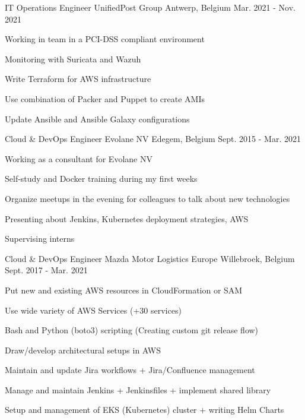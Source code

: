 \begin{cventries}
  \cventry
    {IT Operations Engineer} %
    {UnifiedPost Group} %
    {Antwerp, Belgium} %
    {Mar. 2021 - Nov. 2021} %
    {
      \begin{cvitems} %
        \item {Working in team in a PCI-DSS compliant environment}
        \item {Monitoring with Suricata and Wazuh}
        \item {Write Terraform for AWS infrastructure}
        \item {Use combination of Packer and Puppet to create AMIs}
        \item {Update Ansible and Ansible Galaxy configurations}
      \end{cvitems}
    }

  \cventry
    {Cloud \& DevOps Engineer} %
    {Evolane NV} %
    {Edegem, Belgium} %
    {Sept. 2015 - Mar. 2021} %
    {
      \begin{cvitems} %
        \item {Working as a consultant for Evolane NV}
        \item {Self-study and Docker training during my first weeks}
        \item {Organize meetups in the evening for colleagues to talk about new technologies}
        \item {Presenting about Jenkins, Kubernetes deployment strategies, AWS}
        \item {Supervising interns}
      \end{cvitems}
    }

  \cventry
    {Cloud \& DevOps Engineer} %
    {Mazda Motor Logistics Europe} %
    {Willebroek, Belgium} %
    {Sept. 2017 - Mar. 2021} %
    {
      \begin{cvitems} %
        \item {Put new and existing AWS resources in CloudFormation or SAM}
        \item {Use wide variety of AWS Services (+30 services)}
        \item {Bash and Python (boto3) scripting (Creating custom git release flow)}
        \item {Draw/develop architectural setups in AWS}
        \item {Maintain and update Jira workflows + Jira/Confluence management}
        \item {Manage and maintain Jenkins + Jenkinsfiles + implement shared library}
        \item {Setup and management of EKS (Kubernetes) cluster + writing Helm Charts}
      \end{cvitems}
    }


\end{cventries}

